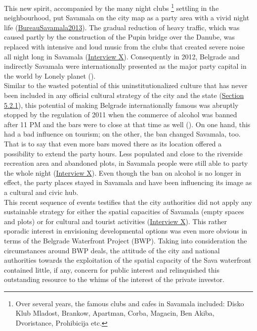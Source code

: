 \documentclass[11pt]{report}
\begin{document}
This new spirit, accompanied by the many night clubs
\footnote{Over several years, the famous clubs and cafes in Savamala included: Disko Klub Mladost, Brankow, Apartman, Corba, Magacin, Ben Akiba, Dvoristance, Prohibicija etc.}
settling in the neighbourhood,
put Savamala on the city map as a  party area with a vivid night life
(\href{Bureau Savamala}{BureauSavamala2013}).
The gradual reduction of heavy traffic, which was caused partly by the construction of the Pupin bridge over the Danube, was replaced with intensive and loud music from the clubs that created severe noise all night long in Savamala
(\href{InterviewX}{Interview X}).
Consequently in 2012, Belgrade and indirectly Savamala were internationally presented as the major party capital in the world by Lonely planet (\href{Lonely Planet}{\citealt{planet_ultimate_2012}}).
\\

Similar to the wasted potential of this uninstitutionalized culture that has never been included in any official cultural strategy of the city and the state (\href{Section 5.2.1}{Section 5.2.1}), this potential of making Belgrade internationally famous was abruptly stopped by the regulation of 2011 when the commerce of alcohol was banned after 11 PM and the bars were to close at that time as well (\href{Vreme}\cite{Vreme2011}). %
On one hand, this had a bad influence on tourism; on the other, the ban changed Savamala, too. That is to say that even more bars moved there as its location offered a possibility to extend the party hours. Less populated and close to the riverside recreation area and abandoned plots, in Savamala people were still able to party the whole night (\href{InterviewX}{Interview X}).
Even though the ban on alcohol is no longer in effect, the party places stayed in Savamala and have been influencing its image as a cultural and civic hub.
\\

This recent sequence of events testifies that the city authorities did not apply any sustainable strategy for either the spatial capacities of Savamala (empty spaces and plots) or for cultural and tourist activities  (\href{InterviewX}{Interview X}).
This rather sporadic interest in envisioning developmental options was even more obvious in terms of the Belgrade Waterfront Project (BWP). Taking into consideration the circumstances around BWP deals, the attitude of the city and national authorities towards the exploitation of the spatial capacity of the Sava waterfront contained little, if any, concern for public interest and relinquished this outstanding resource to the whims of the interest of the private investor.
\\
\end{document}
